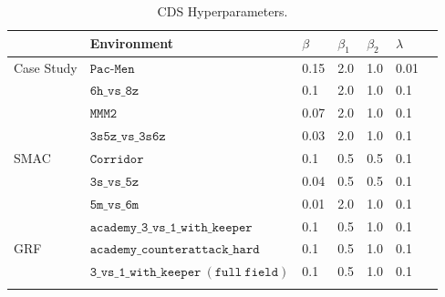 \begin{table}[h]
\centering
\caption{CDS Hyperparameters.}
\begin{tabular}{lllllll}
\hline                  & Environment                                       & $\beta$      & $\beta_1$ & $\beta_2$ & $\lambda$
\\ \hline Case Study    & $\mathtt{Pac}$-$\mathtt{Men}$                     & 0.15         & 2.0       & 1.0       & 0.01
\\ \hline               & $\mathtt{6h\_vs\_8z}$                             & 0.1          & 2.0       & 1.0       & 0.1
\\                      & $\mathtt{MMM2}$                                   & 0.07         & 2.0       & 1.0       & 0.1
\\                      & $\mathtt{3s5z\_vs\_3s6z}$                         & 0.03         & 2.0       & 1.0       & 0.1
\\ SMAC                 & $\mathtt{Corridor}$                               & 0.1          & 0.5       & 0.5       & 0.1
\\                      & $\mathtt{3s\_vs\_5z}$                             & 0.04         & 0.5       & 0.5       & 0.1
\\                      & $\mathtt{5m\_vs\_6m}$                             & 0.01         & 2.0       & 1.0       & 0.1
\\ \hline               & $\mathtt{academy\_3\_vs\_1\_with\_keeper}$        & 0.1          & 0.5       & 1.0       & 0.1
\\ GRF                  & $\mathtt{academy\_counterattack\_hard}$           & 0.1          & 0.5       & 1.0       & 0.1
\\                      & $\mathtt{3\_vs\_1\_with\_keeper\ (full\ field)}$  & 0.1          & 0.5       & 1.0       & 0.1
\\ \hline
\label{table_baseline}
\end{tabular}
\end{table}

